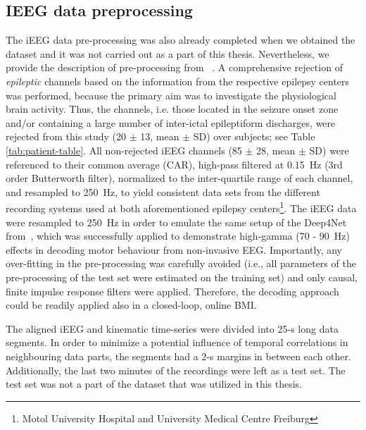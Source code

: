 \subsection{IEEG data preprocessing}\label{subsec:ieeg-data-preprocessing}
The iEEG data pre-processing was also already completed when we obtained the dataset and it was not carried out as a part of this thesis.
Nevertheless, we provide the description of pre-processing from ~\cite{Hammer-2021}.
A comprehensive rejection of \textit{epileptic} channels based on the information from the respective epilepsy centers was performed, because the primary aim was to investigate the physiological brain activity.
Thus, the channels, i.e. those located in the seizure onset zone and/or containing a large number of inter-ictal epileptiform discharges, were rejected from this study (20 $\pm$ 13, mean $\pm$ SD) over subjects; see Table \ref{tab:patient-table}.
All non-rejected iEEG channels (85 $\pm$ 28, mean $\pm$ SD) were referenced to their common average (CAR), high-pass filtered at 0.15~Hz (3rd order Butterworth filter), normalized to the inter-quartile range of each channel, and resampled to 250~Hz, to yield consistent data sets from the different recording systems used at both aforementioned epilepsy centers\footnote{Motol University Hospital and University Medical Centre Freiburg}.
The iEEG data were resampled to 250~Hz in order to emulate the same setup of the Deep4Net from~\cite{schirrmeister-deep-2017}, which was successfully applied to demonstrate high-gamma (70 - 90~Hz) effects in decoding motor behaviour from non-invasive EEG. Importantly, any over-fitting in the pre-processing was carefully avoided (i.e., all parameters of the pre-processing of the test set were estimated on the training set) and only causal, finite impulse response filters were applied.
Therefore, the decoding approach could be readily applied also in a closed-loop, online BMI.

The aligned iEEG and kinematic time-series were divided into 25-s long data segments.
In order to minimize a potential influence of temporal correlations in neighbouring data parts, the segments had a 2-s margins in between each other.
Additionally, the last two minutes of the recordings were left as a test set.
The test set was not a part of the dataset that was utilized in this thesis.


